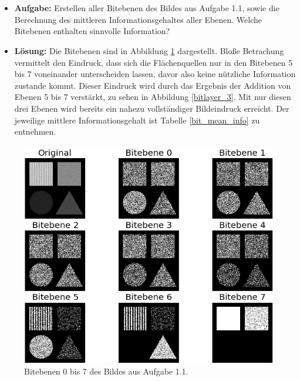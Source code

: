 \documentclass[12pt, a4paper, twoside]{report}
\begin{document}
\section{}
\begin{itemize}
\item \textbf{Aufgabe:} Erstellen aller Bitebenen des Bildes aus Aufgabe 1.1, sowie die Berechnung des mittleren Informationsgehaltes aller Ebenen. Welche Bitebenen enthalten sinnvolle Information?
\item \textbf{Lösung:} Die Bitebenen sind in Abbildung \ref{bitlayer} dargestellt. Bloße Betrachung vermittelt den Eindruck, dass sich die Flächenquellen nur in den Bitebenen 5 bis 7 voneinander unterscheiden lassen, davor also keine nützliche Information zustande kommt. Dieser Eindruck wird durch das Ergebnis der Addition von Ebenen 5 bis 7 verstärkt, zu sehen in Abbildung \ref{bitlayer_3}. Mit nur diesen drei Ebenen wird bereits ein nahezu vollständiger Bildeindruck erreicht. Der jeweilige mittlere Informationsgehalt ist Tabelle \ref{bit_mean_info} zu entnehmen.
\end{itemize}

\begin{figure}[h]
\centering
\includegraphics[width=\textwidth]{../bilder/bitebenen.png}
\caption{Bitebenen 0 bis 7 des Bildes aus Aufgabe 1.1.}
\label{bitlayer}
\end{figure}
\end{document}

